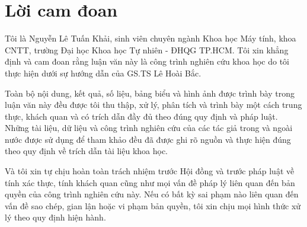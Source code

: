 \chapter*{Lời cam đoan}
\label{reassurances}

Tôi là Nguyễn Lê Tuấn Khải, sinh viên chuyên ngành Khoa học Máy tính, khoa CNTT, trường Đại học Khoa học Tự nhiên - ĐHQG TP.HCM. Tôi xin khẳng định và cam đoan rằng luận văn này là công trình nghiên cứu khoa học do tôi thực hiện dưới sự hướng dẫn của GS.TS Lê Hoài Bắc.

Toàn bộ nội dung, kết quả, số liệu, bảng biểu và hình ảnh được trình bày trong luận văn này đều được tôi thu thập, xử lý, phân tích và trình bày một cách trung thực, khách quan và có trích dẫn đầy đủ theo đúng quy định và pháp luật. Những tài liệu, dữ liệu và công trình nghiên cứu của các tác giả trong và ngoài nước được sử dụng để tham khảo đều đã được ghi rõ nguồn và thực hiện đúng theo quy định về trích dẫn tài liệu khoa học.

Và tôi xin tự chịu hoàn toàn trách nhiệm trước Hội đồng và trước pháp luật về tính xác thực, tính khách quan cũng như mọi vấn đề pháp lý liên quan đến bản quyền của công trình nghiên cứu này.  Nếu có bất kỳ sai phạm nào liên quan đến vấn đề sao chép, gian lận hoặc vi phạm bản quyền, tôi xin chịu mọi hình thức xử lý theo quy định hiện hành.
